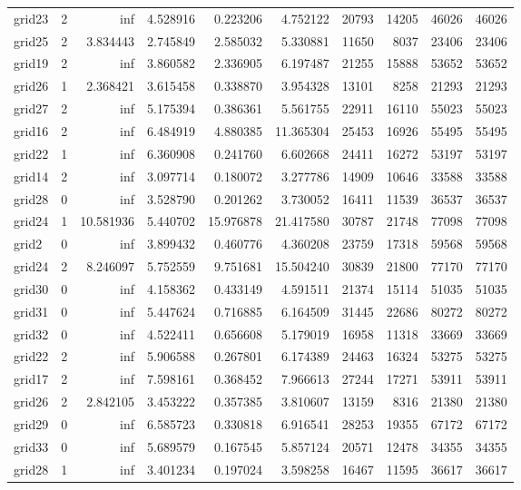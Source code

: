 \begin{longtable}{|l|r|r|r|r|r|r|r|r|r|}
grid23 & 2 & inf & 4.528916 & 0.223206 & 4.752122 & 20793 & 14205 & 46026 & 46026 \\
grid25 & 2 & 3.834443 & 2.745849 & 2.585032 & 5.330881 & 11650 & 8037 & 23406 & 23406 \\
grid19 & 2 & inf & 3.860582 & 2.336905 & 6.197487 & 21255 & 15888 & 53652 & 53652 \\
grid26 & 1 & 2.368421 & 3.615458 & 0.338870 & 3.954328 & 13101 & 8258 & 21293 & 21293 \\
grid27 & 2 & inf & 5.175394 & 0.386361 & 5.561755 & 22911 & 16110 & 55023 & 55023 \\
grid16 & 2 & inf & 6.484919 & 4.880385 & 11.365304 & 25453 & 16926 & 55495 & 55495 \\
grid22 & 1 & inf & 6.360908 & 0.241760 & 6.602668 & 24411 & 16272 & 53197 & 53197 \\
grid14 & 2 & inf & 3.097714 & 0.180072 & 3.277786 & 14909 & 10646 & 33588 & 33588 \\
grid28 & 0 & inf & 3.528790 & 0.201262 & 3.730052 & 16411 & 11539 & 36537 & 36537 \\
grid24 & 1 & 10.581936 & 5.440702 & 15.976878 & 21.417580 & 30787 & 21748 & 77098 & 77098 \\
grid2 & 0 & inf & 3.899432 & 0.460776 & 4.360208 & 23759 & 17318 & 59568 & 59568 \\
grid24 & 2 & 8.246097 & 5.752559 & 9.751681 & 15.504240 & 30839 & 21800 & 77170 & 77170 \\
grid30 & 0 & inf & 4.158362 & 0.433149 & 4.591511 & 21374 & 15114 & 51035 & 51035 \\
grid31 & 0 & inf & 5.447624 & 0.716885 & 6.164509 & 31445 & 22686 & 80272 & 80272 \\
grid32 & 0 & inf & 4.522411 & 0.656608 & 5.179019 & 16958 & 11318 & 33669 & 33669 \\
grid22 & 2 & inf & 5.906588 & 0.267801 & 6.174389 & 24463 & 16324 & 53275 & 53275 \\
grid17 & 2 & inf & 7.598161 & 0.368452 & 7.966613 & 27244 & 17271 & 53911 & 53911 \\
grid26 & 2 & 2.842105 & 3.453222 & 0.357385 & 3.810607 & 13159 & 8316 & 21380 & 21380 \\
grid29 & 0 & inf & 6.585723 & 0.330818 & 6.916541 & 28253 & 19355 & 67172 & 67172 \\
grid33 & 0 & inf & 5.689579 & 0.167545 & 5.857124 & 20571 & 12478 & 34355 & 34355 \\
grid28 & 1 & inf & 3.401234 & 0.197024 & 3.598258 & 16467 & 11595 & 36617 & 36617 \\

\end{longtable}
